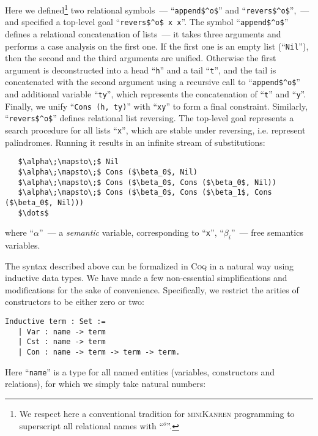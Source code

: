 Here we defined\footnote{We respect here a conventional tradition for \textsc{miniKanren} programming to superscript all relational names with ``$^o$''.}
two relational symbols~--- ``\lstinline|append$^o$|'' and ``\lstinline|revers$^o$|'',~--- and specified a top-level goal ``\lstinline|revers$^o$ x x|''.
The symbol ``\lstinline|append$^o$|'' defines a relational concatenation of lists~--- it takes three arguments and performs a case analysis on the first one. If the
first one is an empty list (``\lstinline|Nil|''), then the second and the third arguments are unified. Otherwise the first argument is deconstructed into a head ``\lstinline|h|''
and a tail ``\lstinline|t|'', and the tail is concatenated with the second argument using a recursive call to ``\lstinline|append$^o$|'' and additional variable ``\lstinline|ty|'', which
represents the concatenation of ``\lstinline|t|'' and ``\lstinline|y|''. Finally, we unify ``\lstinline|Cons (h, ty)|'' with ``\lstinline|xy|'' to form a final constraint. Similarly,
``\lstinline|revers$^o$|'' defines relational list reversing. The top-level goal represents a search procedure for all lists ``\lstinline|x|'', which are stable under reversing, i.e.
represent palindromes. Running it results in an infinite stream of substitutions:

\begin{lstlisting}
   $\alpha\;\mapsto\;$ Nil
   $\alpha\;\mapsto\;$ Cons ($\beta_0$, Nil)
   $\alpha\;\mapsto\;$ Cons ($\beta_0$, Cons ($\beta_0$, Nil))
   $\alpha\;\mapsto\;$ Cons ($\beta_0$, Cons ($\beta_1$, Cons ($\beta_0$, Nil)))
   $\dots$
\end{lstlisting}

where ``$\alpha$''~--- a \emph{semantic} variable, corresponding to ``\lstinline|x|'', ``$\beta_i$''~--- free semantics variables.

The syntax described above can be formalized in \textsc{Coq} in a natural way using inductive data types. We have made a few non-essential simplifications and modifications for the sake of convenience.
Specifically, we restrict the arities of constructors to be either zero or two:

\begin{lstlisting}[language=Coq,basicstyle=\footnotesize]
   Inductive term : Set :=
   | Var : name -> term
   | Cst : name -> term
   | Con : name -> term -> term -> term.
\end{lstlisting}

Here ``\lstinline[language=Coq]{name}'' is a type for all named entities (variables, constructors and relations), for which we simply take natural numbers:

